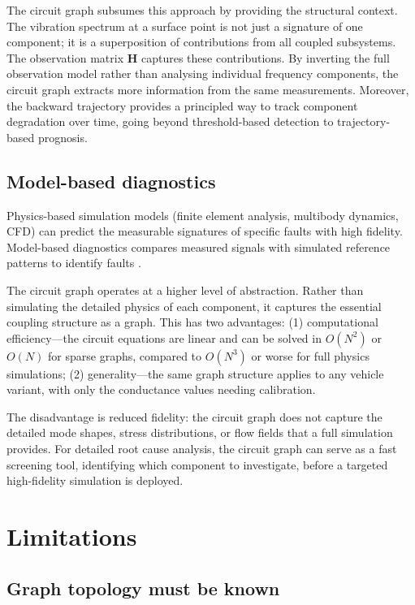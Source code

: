 \documentclass[twocolumn,10pt,a4paper]{article}
\theoremstyle{definition}
\theoremstyle{remark}
\newcommand{\mat}[1]{\mathbf{#1}}
\begin{document}
The circuit graph subsumes this approach by providing the structural context. The vibration spectrum at a surface point is not just a signature of one component; it is a superposition of contributions from all coupled subsystems. The observation matrix $\mat{H}$ captures these contributions. By inverting the full observation model rather than analysing individual frequency components, the circuit graph extracts more information from the same measurements. Moreover, the backward trajectory provides a principled way to track component degradation over time, going beyond threshold-based detection to trajectory-based prognosis.

\subsection{Model-based diagnostics}

Physics-based simulation models (finite element analysis, multibody dynamics, CFD) can predict the measurable signatures of specific faults with high fidelity. Model-based diagnostics compares measured signals with simulated reference patterns to identify faults \citep{Lei2020}.

The circuit graph operates at a higher level of abstraction. Rather than simulating the detailed physics of each component, it captures the essential coupling structure as a graph. This has two advantages: (1) computational efficiency---the circuit equations are linear and can be solved in $O(N^2)$ or $O(N)$ for sparse graphs, compared to $O(N^3)$ or worse for full physics simulations; (2) generality---the same graph structure applies to any vehicle variant, with only the conductance values needing calibration.

The disadvantage is reduced fidelity: the circuit graph does not capture the detailed mode shapes, stress distributions, or flow fields that a full simulation provides. For detailed root cause analysis, the circuit graph can serve as a fast screening tool, identifying which component to investigate, before a targeted high-fidelity simulation is deployed.


\section{Limitations}\label{sec:limitations}

\subsection{Graph topology must be known}
\end{document}
